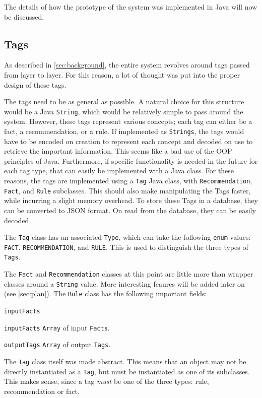 \documentclass[titlepage,11pt]{article}
\newcommand{\code}[1]{\texttt{#1}}
\begin{document}
The details of how the prototype of the system was implemented in Java will now be discussed.

\subsection{Tags}

As described in \autoref{sec:background}, the entire system revolves around tags passed from layer to layer. For this reason, a lot of thought was put into the proper design of these tags.

The tags need to be as general as possible. A natural choice for this structure would be a Java \code{String}, which would be relatively simple to pass around the system. However, these tags represent various concepts; each tag can either be a fact, a recommendation, or a rule. If implemented as \code{Strings}, the tags would have to be encoded on creation to represent each concept and decoded on use to retrieve the important information. This seems like a bad use of the OOP principles of Java. Furthermore, if specific functionality is needed in the future for each tag type, that can easily be implemented with a Java class. For these reasons, the tags are implemented using a \code{Tag} Java class, with \code{Recommendation}, \code{Fact}, and \code{Rule} subclasses. This should also make manipulating the Tags faster, while incurring a slight memory overhead. To store these Tags in a database, they can be converted to JSON format. On read from the database, they can be easily decoded.

The \code{Tag} class has an associated \code{Type}, which can take the following \code{enum} values: \code{FACT}, \code{RECOMMENDATION}, and \code{RULE}. This is used to distinguish the three types of \code{Tags}.

The \code{Fact} and \code{Recommendation} classes at this point are little more than wrapper classes around a \code{String} value. More interesting feaures will be added later on (see \autoref{sec:plan}). The \code{Rule} class has the following important fields:

\begin{labeling}{\code{inputFacts}}
	\item[\code{inputFacts}] \code{Array} of input \code{Facts}.
	\item[\code{outputTags}] \code{Array} of output \code{Tags}.
\end{labeling}

The \code{Tag} class itself was made abstract. This means that an object may not be directly instantiated as a \code{Tag}, but must be instantiated as one of its subclasses. This makes sense, since a tag \emph{must} be one of the three types: rule, recommendation or fact.
\end{document}

